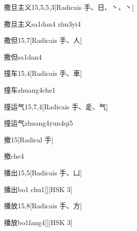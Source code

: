 \begin{entry}{撒旦主义}{15,5,5,3}[Radicais ⼿、⽇、⼂、⼂]
  \begin{phonetics}{撒旦主义}{sa1dan4 zhu3yi4}
  \end{phonetics}
\end{entry}

\begin{entry}{撒但}{15,7}[Radicais ⼿、⼈]
  \begin{phonetics}{撒但}{sa1dan4}
  \end{phonetics}
\end{entry}

\begin{entry}{撞车}{15,4}[Radicais ⼿、⾞]
  \begin{phonetics}{撞车}{zhuang4che1}
  \end{phonetics}
\end{entry}

\begin{entry}{撞运气}{15,7,4}[Radicais ⼿、⾡、⽓]
  \begin{phonetics}{撞运气}{zhuang4yun4qi5}
  \end{phonetics}
\end{entry}

\begin{entry}{撤}{15}[Radical ⼿]
  \begin{phonetics}{撤}{che4}
  \end{phonetics}
\end{entry}

\begin{entry}{播出}{15,5}[Radicais ⼿、⼐]
  \begin{phonetics}{播出}{bo1 chu1}[][HSK 3]
  \end{phonetics}
\end{entry}

\begin{entry}{播放}{15,8}[Radicais ⼿、⽅]
  \begin{phonetics}{播放}{bo1fang4}[][HSK 3]
  \end{phonetics}
\end{entry}


